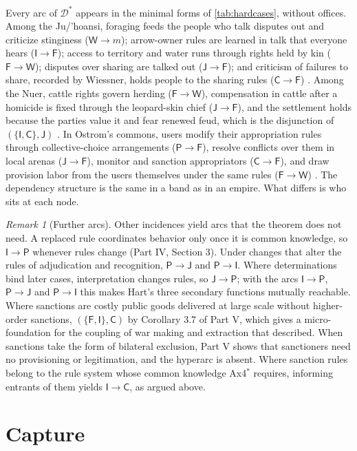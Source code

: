 \documentclass[11pt,letterpaper]{article}
\theoremstyle{definition}
\theoremstyle{remark}
\newtheorem{remark}[theorem]{Remark}
\newcommand{\pF}{\mathsf{F}}
\newcommand{\pP}{\mathsf{P}}
\newcommand{\pJ}{\mathsf{J}}
\newcommand{\pI}{\mathsf{I}}
\newcommand{\pC}{\mathsf{C}}
\newcommand{\pW}{\mathsf{W}}
\newcommand{\Dstar}{\mathcal{D}^{*}}
\begin{document}
Every arc of $\Dstar$ appears in the minimal forms of \cref{tab:hardcases}, without offices. Among the Ju/'hoansi, foraging feeds the people who talk disputes out and criticize stinginess ($\pW\to m$); arrow-owner rules are learned in talk that everyone hears ($\pI\to\pF$); access to territory and water runs through rights held by kin ($\pF\to\pW$); disputes over sharing are talked out ($\pJ\to\pF$); and criticism of failures to share, recorded by Wiessner, holds people to the sharing rules ($\pC\to\pF$) \citep{lee2013,wiessner2005}. Among the Nuer, cattle rights govern herding ($\pF\to\pW$), compensation in cattle after a homicide is fixed through the leopard-skin chief ($\pJ\to\pF$), and the settlement holds because the parties value it and fear renewed feud, which is the disjunction of $(\{\pI,\pC\},\pJ)$ \citep{evanspritchard1940}. In Ostrom's commons, users modify their appropriation rules through collective-choice arrangements ($\pP\to\pF$), resolve conflicts over them in local arenas ($\pJ\to\pF$), monitor and sanction appropriators ($\pC\to\pF$), and draw provision labor from the users themselves under the same rules ($\pF\to\pW$) \citep{ostrom1990}. The dependency structure is the same in a band as in an empire. What differs is who sits at each node.

\begin{remark}[Further arcs]
\label{rem:formalized-state:further}
Other incidences yield arcs that the theorem does not need. A replaced rule coordinates behavior only once it is common knowledge, so $\pI\to\pP$ whenever rules change (Part IV, Section 3). Under changes that alter the rules of adjudication and recognition, $\pP\to\pJ$ and $\pP\to\pI$. Where determinations bind later cases, interpretation changes rules, so $\pJ\to\pP$; with the arcs $\pI\to\pP$, $\pP\to\pJ$ and $\pP\to\pI$ this makes Hart's three secondary functions mutually reachable. Where sanctions are costly public goods delivered at large scale without higher-order sanctions, $(\{\pF,\pI\},\pC)$ by Corollary 3.7 of Part V, which gives a micro-foundation for the coupling of war making and extraction that \citet{tilly1990} described. When sanctions take the form of bilateral exclusion, Part V shows that sanctioners need no provisioning or legitimation, and the hyperarc is absent. Where sanction rules belong to the rule system whose common knowledge Ax4$^{*}$ requires, informing entrants of them yields $\pI\to\pC$, as argued above.
\end{remark}

\section{Capture}
\label{sec:capture}
\end{document}
